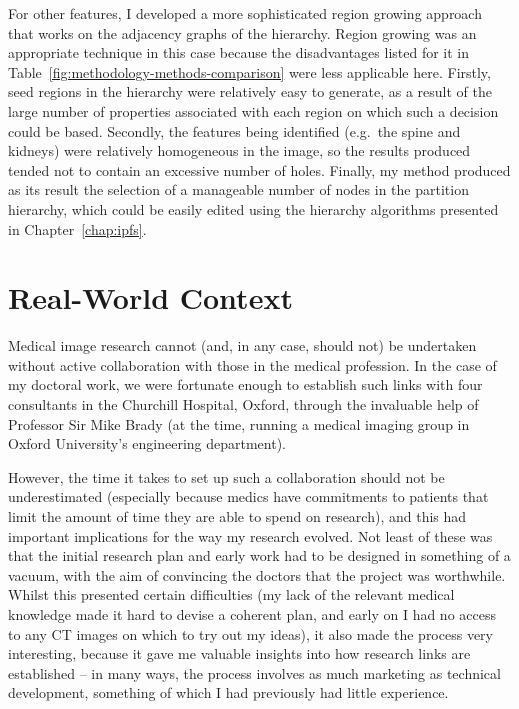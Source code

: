 For other features, I developed a more sophisticated region growing approach that works on the adjacency graphs of the hierarchy. Region growing was an appropriate technique in this case because the disadvantages listed for it in Table~\ref{fig:methodology-methods-comparison} were less applicable here. Firstly, seed regions in the hierarchy were relatively easy to generate, as a result of the large number of properties associated with each region on which such a decision could be based. Secondly, the features being identified (e.g.~the spine and kidneys) were relatively homogeneous in the image, so the results produced tended not to contain an excessive number of holes. Finally, my method produced as its result the selection of a manageable number of nodes in the partition hierarchy, which could be easily edited using the hierarchy algorithms presented in Chapter~\ref{chap:ipfs}.

\section{Real-World Context}

Medical image research cannot (and, in any case, should not) be undertaken without active collaboration with those in the medical profession. In the case of my doctoral work, we were fortunate enough to establish such links with four consultants in the Churchill Hospital, Oxford, through the invaluable help of Professor Sir Mike Brady (at the time, running a medical imaging group in Oxford University's engineering department).

However, the time it takes to set up such a collaboration should not be underestimated (especially because medics have commitments to patients that limit the amount of time they are able to spend on research), and this had important implications for the way my research evolved. Not least of these was that the initial research plan and early work had to be designed in something of a vacuum, with the aim of convincing the doctors that the project was worthwhile. Whilst this presented certain difficulties (my lack of the relevant medical knowledge made it hard to devise a coherent plan, and early on I had no access to any CT images on which to try out my ideas), it also made the process very interesting, because it gave me valuable insights into how research links are established -- in many ways, the process involves as much marketing as technical development, something of which I had previously had little experience.

